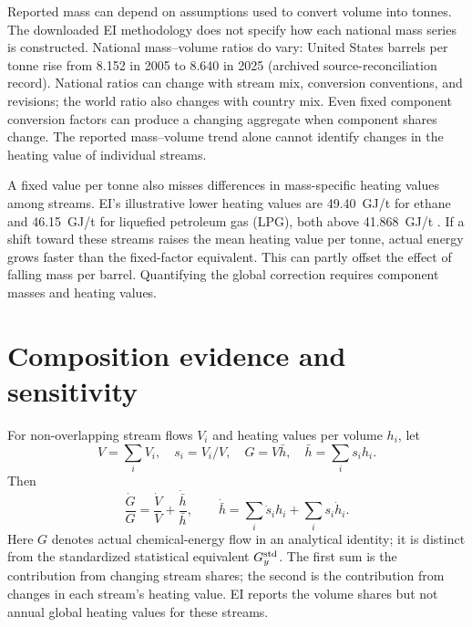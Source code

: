 \documentclass[reprint,aps,pra,longbibliography,floatfix]{revtex4-2}
\begin{document}
Reported mass can depend on assumptions used to convert volume into tonnes. The downloaded EI methodology does not specify how each national mass series is constructed. National mass--volume ratios do vary: United States barrels per tonne rise from 8.152 in 2005 to 8.640 in 2025 (archived source-reconciliation record). National ratios can change with stream mix, conversion conventions, and revisions; the world ratio also changes with country mix. Even fixed component conversion factors can produce a changing aggregate when component shares change. The reported mass--volume trend alone cannot identify changes in the heating value of individual streams.

A fixed value per tonne also misses differences in mass-specific heating values among streams. EI's illustrative lower heating values are 49.40~GJ/t for ethane and 46.15~GJ/t for liquefied petroleum gas (LPG), both above 41.868~GJ/t \citep{eiGuide2026}. If a shift toward these streams raises the mean heating value per tonne, actual energy grows faster than the fixed-factor equivalent. This can partly offset the effect of falling mass per barrel. Quantifying the global correction requires component masses and heating values.

\section{Composition evidence and sensitivity}
For non-overlapping stream flows $V_i$ and heating values per volume $h_i$, let
\begin{equation}
 V=\sum_iV_i,\quad s_i=V_i/V,\quad
 G=V\bar h,\quad \bar h=\sum_i s_ih_i.
\end{equation}
Then
\begin{equation}
 \frac{\dot G}{G}=\frac{\dot V}{V}+\frac{\dot{\bar h}}{\bar h},\qquad
 \dot{\bar h}=\sum_i\dot s_ih_i+\sum_i s_i\dot h_i.
 \label{eq:composition}
\end{equation}
Here $G$ denotes actual chemical-energy flow in an analytical identity; it is distinct from the standardized statistical equivalent $G_y^{\rm std}$. The first sum is the contribution from changing stream shares; the second is the contribution from changes in each stream's heating value. EI reports the volume shares but not annual global heating values for these streams.
\end{document}
